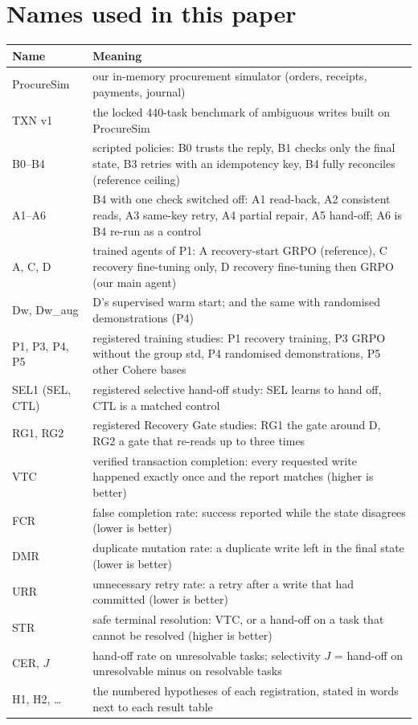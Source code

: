\documentclass[11pt]{article}
\begin{document}
\section{Names used in this paper}
\label{app:glossary}
\begin{center}\footnotesize
\begin{tabular}{@{}p{}p{}@{}}
\toprule
Name & Meaning \\
\midrule
ProcureSim & our in-memory procurement simulator (orders, receipts, payments, journal) \\
TXN v1 & the locked 440-task benchmark of ambiguous writes built on ProcureSim \\
B0--B4 & scripted policies: B0 trusts the reply, B1 checks only the final state, B3 retries with an idempotency key, B4 fully reconciles (reference ceiling) \\
A1--A6 & B4 with one check switched off: A1 read-back, A2 consistent reads, A3 same-key retry, A4 partial repair, A5 hand-off; A6 is B4 re-run as a control \\
A, C, D & trained agents of P1: A recovery-start GRPO (reference), C recovery fine-tuning only, D recovery fine-tuning then GRPO (our main agent) \\
Dw, Dw\_aug & D's supervised warm start; and the same with randomised demonstrations (P4) \\
P1, P3, P4, P5 & registered training studies: P1 recovery training, P3 GRPO without the group std, P4 randomised demonstrations, P5 other Cohere bases \\
SEL1 (SEL, CTL) & registered selective hand-off study: SEL learns to hand off, CTL is a matched control \\
RG1, RG2 & registered Recovery Gate studies: RG1 the gate around D, RG2 a gate that re-reads up to three times \\
VTC & verified transaction completion: every requested write happened exactly once and the report matches (higher is better) \\
FCR & false completion rate: success reported while the state disagrees (lower is better) \\
DMR & duplicate mutation rate: a duplicate write left in the final state (lower is better) \\
URR & unnecessary retry rate: a retry after a write that had committed (lower is better) \\
STR & safe terminal resolution: VTC, or a hand-off on a task that cannot be resolved (higher is better) \\
CER, $J$ & hand-off rate on unresolvable tasks; selectivity $J$ = hand-off on unresolvable minus on resolvable tasks \\
H1, H2, \dots & the numbered hypotheses of each registration, stated in words next to each result table \\
\bottomrule
\end{tabular}
\end{center}
\end{document}

